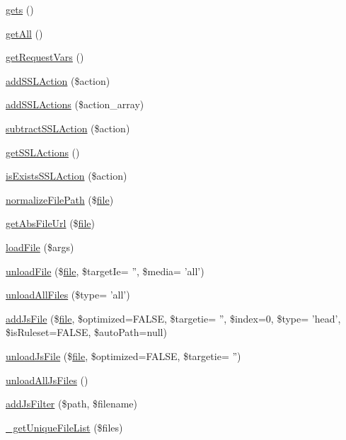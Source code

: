 \begin{DoxyCompactItemize}
\hyperlink{classContext_ae906c0b1533a8e4ce7836d3665b46288}{gets} ()
\item 
\hyperlink{classContext_a89ad6fd5c093e257e82822d16dc67ac4}{get\-All} ()
\item 
\hyperlink{classContext_a9ddbc79a7ba5892d1ea2d793f6ad52c2}{get\-Request\-Vars} ()
\item 
\hyperlink{classContext_a781f5e7a057e6f0992310318a0339ae8}{add\-S\-S\-L\-Action} (\$action)
\item 
\hyperlink{classContext_ab2acd5415515b232b7cf9f0130f4efa3}{add\-S\-S\-L\-Actions} (\$action\-\_\-array)
\item 
\hyperlink{classContext_a598cb5c571c0a1ffb15f67064e251f0d}{subtract\-S\-S\-L\-Action} (\$action)
\item 
\hyperlink{classContext_a10b68bdba6f55bc725c352aad7844dc7}{get\-S\-S\-L\-Actions} ()
\item 
\hyperlink{classContext_ada5b689e4d143f371c38091b87cfd864}{is\-Exists\-S\-S\-L\-Action} (\$action)
\item 
\hyperlink{classContext_a47a8a7878385f0d5cb7085f933157128}{normalize\-File\-Path} (\$\hyperlink{classfile}{file})
\item 
\hyperlink{classContext_a217a7ff0e32178c6a2cc761de9c88998}{get\-Abs\-File\-Url} (\$\hyperlink{classfile}{file})
\item 
\hyperlink{classContext_a01ddbd076a74f16dc46d3c7b358daea6}{load\-File} (\$args)
\item 
\hyperlink{classContext_afab39232525ca876120253feee0fe3a1}{unload\-File} (\$\hyperlink{classfile}{file}, \$target\-Ie= '', \$media= 'all')
\item 
\hyperlink{classContext_a9125192700ddd7a2234f34a192165902}{unload\-All\-Files} (\$type= 'all')
\item 
\hyperlink{classContext_a69807c3ced3f97920b233a3fce3bb492}{add\-Js\-File} (\$\hyperlink{classfile}{file}, \$optimized=F\-A\-L\-S\-E, \$targetie= '', \$index=0, \$type= 'head', \$is\-Ruleset=F\-A\-L\-S\-E, \$auto\-Path=null)
\item 
\hyperlink{classContext_ac5016f24f0bd279096d3f0cd0c0df5a9}{unload\-Js\-File} (\$\hyperlink{classfile}{file}, \$optimized=F\-A\-L\-S\-E, \$targetie= '')
\item 
\hyperlink{classContext_ac8ac4c21583b50815eb01d9cc4f6405f}{unload\-All\-Js\-Files} ()
\item 
\hyperlink{classContext_ae93f59a2ffac5a3074acd304d10ad7b3}{add\-Js\-Filter} (\$path, \$filename)
\item 
\hyperlink{classContext_a8bde0f7d77424555f9b856664b59e0bc}{\-\_\-get\-Unique\-File\-List} (\$files)

\end{DoxyCompactItemize}
